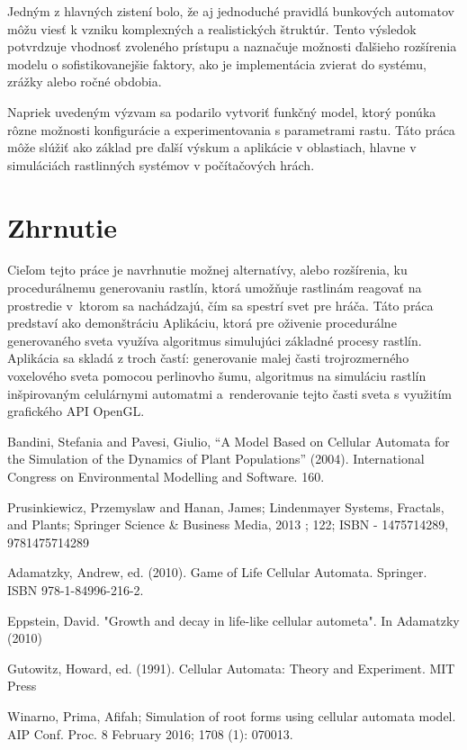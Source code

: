 \documentclass[12pt]{article}
\begin{document}
Jedným z hlavných zistení bolo, že aj jednoduché pravidlá bunkových automatov
môžu viesť k vzniku komplexných a realistických štruktúr. Tento výsledok
potvrdzuje vhodnosť zvoleného prístupu a naznačuje možnosti ďalšieho rozšírenia
modelu o sofistikovanejšie faktory, ako je implementácia zvierat do systému,
zrážky alebo ročné obdobia.

Napriek uvedeným výzvam sa podarilo vytvoriť funkčný model, ktorý ponúka rôzne
možnosti konfigurácie a experimentovania s parametrami rastu. Táto práca môže
slúžiť ako základ pre ďalší výskum a aplikácie v oblastiach, hlavne v simuláciách
rastlinných systémov v počítačových hrách.


\section{Zhrnutie}

Cieľom tejto práce je navrhnutie možnej alternatívy, alebo rozšírenia,
ku procedurálnemu generovaniu rastlín, ktorá umožňuje rastlinám reagovať na
prostredie v~ktorom sa nachádzajú, čím sa spestrí svet pre hráča. Táto práca
predstaví ako demonštráciu Aplikáciu, ktorá pre oživenie procedurálne
generovaného sveta využíva algoritmus simulujúci základné procesy rastlín.
Aplikácia sa skladá z troch častí: generovanie malej časti trojrozmerného
voxelového sveta pomocou perlinovho šumu, algoritmus na simuláciu rastlín
inšpirovaným celulárnymi automatmi a~renderovanie tejto časti sveta s
využitím grafického API OpenGL.


\renewcommand\refname{Zoznam použitej literatúry}
\begin{thebibliography}{99}
	\addcontentsline{toc}{section}{\refname}

	Bandini, Stefania and Pavesi, Giulio,
	``A Model Based on Cellular Automata for the Simulation of the Dynamics of Plant Populations''
	(2004). International Congress on Environmental Modelling and Software. 160.

	Prusinkiewicz, Przemyslaw and Hanan, James; Lindenmayer Systems, Fractals, and Plants;
	Springer Science \& Business Media, 2013 ; 122; ISBN - 1475714289, 9781475714289

	Adamatzky, Andrew, ed. (2010). Game of Life Cellular Automata. Springer.
	ISBN 978-1-84996-216-2.

	Eppstein, David. "Growth and decay in life-like cellular autometa". In Adamatzky (2010)

	Gutowitz, Howard, ed. (1991). Cellular Automata: Theory and Experiment. MIT Press

	Winarno, Prima, Afifah;
	Simulation of root forms using cellular automata model.
	AIP Conf. Proc. 8 February 2016; 1708 (1): 070013.

\end{thebibliography}
\end{document}
